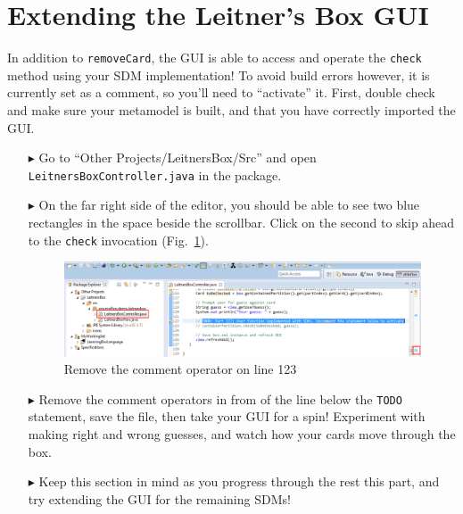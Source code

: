 \newpage
\hypertarget{sec:extendGui}{}
\section{Extending the Leitner's Box GUI}
\genHeader

\vspace{0.5cm}

In addition to \texttt{removeCard}, the GUI is able to access and operate the \texttt{check} method using your SDM implementation! To avoid build errors
however, it is currently set as a comment, so you'll need to ``activate'' it. First, double check and make sure your metamodel is built, and that you have
correctly imported the GUI.

\begin{itemize}

\item[$\blacktriangleright$] Go to ``Other Projects/LeitnersBox/Src'' and open \texttt{Leitners\-Box\-Cont\-roller\-.java} in the package.

\vspace{0.5cm}

\item[$\blacktriangleright$] On the far right side of the editor, you should be able to see two blue rectangles in the space beside the scrollbar. Click on the
second to skip ahead to the \texttt{check} invocation (Fig.~\ref{fig:remComment}).

\vspace{0.5cm}

\begin{figure}[htp]
\begin{center}
  \includegraphics[width=\textwidth]{eclipse_GUICommentLine}
  \caption{Remove the comment operator on line 123}
  \label{fig:remComment}
\end{center}
\end{figure}

\vspace{0.5cm}

\item[$\blacktriangleright$] Remove the comment operators in from of the line below the \texttt{TODO} statement, save the file, then take your GUI for a spin!
Experiment with making right and wrong guesses, and watch how your cards move through the box. 

\item[$\blacktriangleright$] Keep this section in mind as you progress through the rest this part, and try extending the GUI for the remaining SDMs!

\end{itemize}
